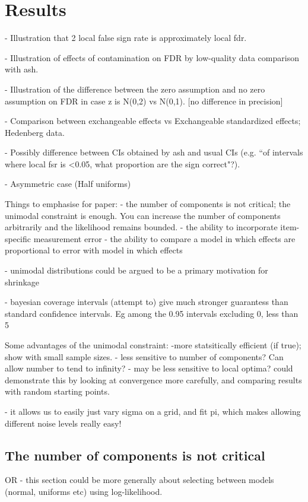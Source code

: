 \documentclass[10pt]{article}
\begin{document}
\section*{Results}


- Illustration that 2 local false sign rate is approximately local fdr.
 
- Illustration of effects of contamination on FDR by low-quality data
comparison with ash.

- Illustration of the difference between the zero assumption and no zero assumption on FDR
in case z is N(0,2) vs N(0,1). [no difference in precision]

- Comparison between exchangeable effects vs Exchangeable standardized effects; Hedenberg data. 

- Possibly difference between CIs obtained by ash and usual CIs (e.g. ``of intervals where local fsr is <0.05, what proportion are the sign correct"?).

- Asymmetric case (Half uniforms)

Things to emphasise for paper:
- the number of components is not critical; the unimodal constraint is enough. You can increase the number of components arbitrarily and the likelihood remains bounded.
- the ability to incorporate item-specific measurement error
- the ability to compare a model in which effects are proportional to error
with model in which effects 

- unimodal distributions could be argued to be a primary motivation for shrinkage

- bayesian coverage intervals (attempt to) give much stronger guarantess than standard confidence intervals. Eg among the 0.95 intervals excluding 0,
less than 5%

Some advantages of the unimodal constraint:
-more statsitically efficient (if true); show with small sample sizes.
- less sensitive to number of components? Can allow number to tend to infinity?
- may be less sensitive to local optima?
could demonstrate this by looking at convergence more carefully, and comparing
results with random starting points.

- it allows us to easily just vary sigma on a grid, and fit pi, which
makes allowing different noise levels really easy!




\subsection{The number of components is not critical}
OR - this section could be more generally about selecting between
models (normal, uniforms etc) using log-likelihood.
\end{document}

